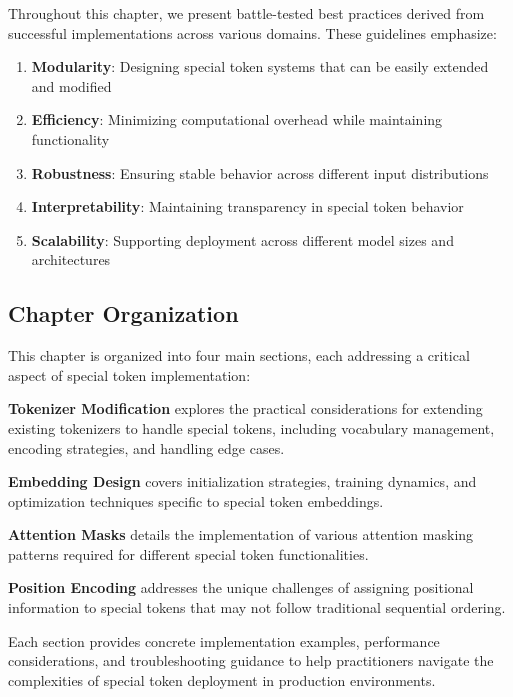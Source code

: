 Throughout this chapter, we present battle-tested best practices derived from successful implementations across various domains. These guidelines emphasize:

\begin{enumerate}
\item \textbf{Modularity}: Designing special token systems that can be easily extended and modified
\item \textbf{Efficiency}: Minimizing computational overhead while maintaining functionality
\item \textbf{Robustness}: Ensuring stable behavior across different input distributions
\item \textbf{Interpretability}: Maintaining transparency in special token behavior
\item \textbf{Scalability}: Supporting deployment across different model sizes and architectures
\end{enumerate}

\subsection{Chapter Organization}

This chapter is organized into four main sections, each addressing a critical aspect of special token implementation:

\textbf{Tokenizer Modification} explores the practical considerations for extending existing tokenizers to handle special tokens, including vocabulary management, encoding strategies, and handling edge cases.

\textbf{Embedding Design} covers initialization strategies, training dynamics, and optimization techniques specific to special token embeddings.

\textbf{Attention Masks} details the implementation of various attention masking patterns required for different special token functionalities.

\textbf{Position Encoding} addresses the unique challenges of assigning positional information to special tokens that may not follow traditional sequential ordering.

Each section provides concrete implementation examples, performance considerations, and troubleshooting guidance to help practitioners navigate the complexities of special token deployment in production environments.